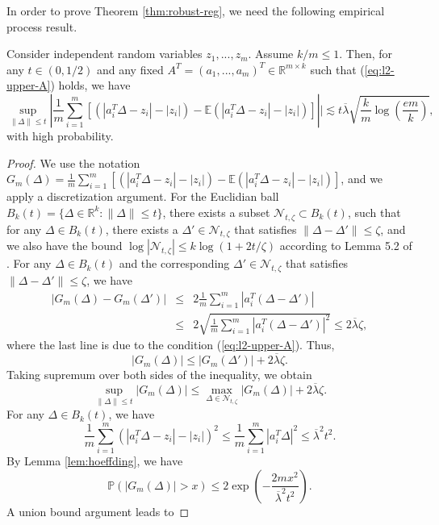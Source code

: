 In order to prove Theorem \ref{thm:robust-reg}, we need the following empirical process result.
\begin{lemma}\label{lem:EP}
Consider independent random variables $z_1,...,z_m$. Assume $k/m\leq 1$. Then, for any $t\in (0,1/2)$ and any fixed $A^T=(a_1,...,a_m)^T\in\mathbb{R}^{m\times k}$ such that (\ref{eq:l2-upper-A}) holds, we have
$$\sup_{\|\Delta\|\leq t}\left|\frac{1}{m}\sum_{i=1}^m[(|a_i^T\Delta-z_i|-|z_i|)-\mathbb{E}(|a_i^T\Delta-z_i|-|z_i|)]\right|| \lesssim t\overline{\lambda}\sqrt{\frac{k}{m}\log\left(\frac{em}{k}\right)},$$
with high probability.
\end{lemma}
\begin{proof}
We use the notation $G_m(\Delta)=\frac{1}{m}\sum_{i=1}^m[(|a_i^T\Delta-z_i|-|z_i|)-\mathbb{E}(|a_i^T\Delta-z_i|-|z_i|)]$, and we apply a discretization argument. For the Euclidian ball $B_k(t)=\{\Delta\in\mathbb{R}^k:\|\Delta\|\leq t\}$, there exists a subset $\mathcal{N}_{t,\zeta}\subset B_k(t)$, such that for any $\Delta\in B_k(t)$, there exists a $\Delta'\in\mathcal{N}_{t,\zeta}$ that satisfies $\|\Delta-\Delta'\|\leq \zeta$, and we also have the bound $\log|\mathcal{N}_{t,\zeta}|\leq k\log(1+2t/\zeta)$ according to Lemma 5.2 of \cite{vershynin2010introduction}. For any $\Delta\in B_k(t)$ and the corresponding $\Delta'\in\mathcal{N}_{t,\zeta}$ that satisfies $\|\Delta-\Delta'\|\leq \zeta$, we have
\begin{eqnarray*}
|G_m(\Delta)-G_m(\Delta')| &\leq& 2\frac{1}{m}\sum_{i=1}^m|a_i^T(\Delta-\Delta')| \\
&\leq& 2\sqrt{\frac{1}{m}\sum_{i=1}^m|a_i^T(\Delta-\Delta')|^2} \leq 2\overline{\lambda}\zeta,
\end{eqnarray*}
where the last line is due to the condition (\ref{eq:l2-upper-A}). Thus,
$$\left|G_m(\Delta)\right| \leq \left|G_m(\Delta')\right| + 2\overline{\lambda}\zeta.$$
Taking supremum over both sides of the inequality, we obtain
\begin{equation}
\sup_{\|\Delta\|\leq t}|G_m(\Delta)| \leq \max_{\Delta\in\mathcal{N}_{t,\zeta}}\left|G_m(\Delta)\right| + 2\overline{\lambda}\zeta. \label{eq:disc-not-good}
\end{equation}
For any $\Delta\in B_k(t)$, we have
$$\frac{1}{m}\sum_{i=1}^m\left(|a_i^T\Delta-z_i|-|z_i|\right)^2\leq \frac{1}{m}\sum_{i=1}^m|a_i^T\Delta|^2\leq \overline{\lambda}^2t^2.$$
By Lemma \ref{lem:hoeffding}, we have
$$\mathbb{P}\left(\left|G_m(\Delta)\right| > x\right) \leq 2\exp\left(-\frac{2mx^2}{\overline{\lambda}^2t^2}\right).$$
A union bound argument leads to

\end{proof}
